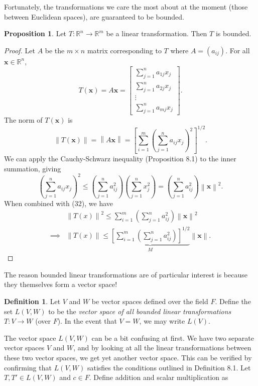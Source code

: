 \documentclass{article}
\newcommand{\R}{\mathbb{R}}
\newcommand{\x}{\mathbf{x}}
\newcommand{\norm}[1]{\left\lVert#1\right\rVert}
\theoremstyle{definition}
\newtheorem{proposition}{Proposition}[section]
\newtheorem{definition}{Definition}[section]
\begin{document}
	Fortunately, the transformations we care the most about at the moment (those between Euclidean spaces), are guaranteed to be bounded.
	\begin{proposition}
		Let $ T:\R^n\to\R^m $ be a linear transformation. Then $ T $ is bounded. 
	\end{proposition}
	\begin{proof}
		Let $ A $ be the $ m\times n $ matrix corresponding to $ T $ where $ A = (a_{ij}) $. For all $ \x\in \R^n $, $$ T(\x) = A\x = \begin{bmatrix}
			\sum_{j=1}^{n}a_{1j}x_j\\
			\sum_{j=1}^{n}a_{2j}x_j\\\vdots \\ 
			\sum_{j=1}^{n}a_{mj}x_j
		\end{bmatrix} .$$
		The norm of $ T(\x) $ is 
		\begin{equation}\label{key}
			\norm{T(\x)} = \norm{A\x} =\left[ \sum_{i=1}^{m}\left(\sum_{j=1}^{n}a_{ij}x_j\right)^2\right]^{1/2} .
		\end{equation}
		We can apply the Cauchy-Schwarz inequality (Proposition 8.1) to the inner summation, giving 
		$$ \left(\sum_{j=1}^{n}a_{ij}x_j\right)^2 \le \left(\sum_{j=1}^{n}a_{ij}^2\right) \left(\sum_{j=1}^{n}x_j^2\right)= \left(\sum_{j=1}^{n}a_{ij}^2\right) \norm{\x}^2 .$$ When combined with (32), we have 
		\begin{align*}
			&\norm{T(x)} ^2\le  \sum_{i=1}^{m} \left(\sum_{j=1}^{n}a_{ij}^2\right)\norm{\x}^2\\
			\implies& \norm{T(x)} \le \underbrace{\left[ \sum_{i=1}^{m} \left(\sum_{j=1}^{n}a_{ij}^2\right)\right]^{1/2}}_M\norm{\x} .
		\end{align*}
	\end{proof}
	The reason bounded linear transformations are of particular interest is because they themselves form a vector space!
	\begin{definition}
		Let $ V $ and $ W $ be vector spaces defined over the field $ F $. Define the set $ L(V,W) $ to be the \textit{\color{red}vector space of all bounded linear transformations} $ T:V\to W $ (over $ F $). In the event that $ V =W $, we may write $ L(V) $. 
	\end{definition}
	The vector space $ L(V,W) $ can be a bit confusing at first. We have two separate vector spaces $ V $ and $ W $, and by looking at all the linear transformations between these two vector spaces, we get yet another vector space. This can be verified by confirming that $ L(V,W) $ satisfies the conditions outlined in Definition 8.1. Let $ T,T'\in L(V,W) $ and $ c\in F $. Define addition and scalar multiplication as 
\end{document}
